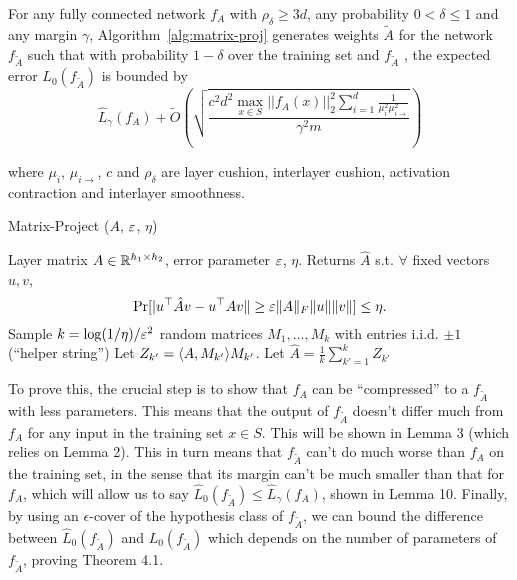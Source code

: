 \begin{theorem}\label{fc-net-theorem} For any fully connected network $f_A$ with $\rho_\delta \geq 3d$, any probability $0 < \delta \leq 1$ and any margin $\gamma$, Algorithm~\ref{alg:matrix-proj} generates weights $\tilde{A}$ for the network $f_{\tilde{A}}$ such that with probability $1-\delta$ over the training set and $f_{\tilde{A}}$ , the expected error $L_0(f_{\tilde{A}})$ is bounded by 
\begin{equation*}
    \hat{L}_\gamma(f_A) + \tilde{O}\left ( \sqrt{\frac{c^2 d^2 \max_{x \in S} || f_A(x) ||_2^2 \sum_{i=1}^d \frac{1}{\mu_i^2 \mu^2_{i\rightarrow}}}{\gamma^2 m}} \right)
\end{equation*}

where $\mu_i$, $\mu_{i\rightarrow}$, $c$ and $\rho_\delta$ are layer cushion, interlayer cushion, activation contraction and interlayer smoothness.

\end{theorem}

\begin{algorithm}
    \caption{Matrix-Project ($A$, $\eps$, $\eta$)}
    \begin{algorithmic}
        \REQUIRE Layer matrix $A\in \mathbb{R}^{h_1\times h_2}$, error parameter $\eps$, $\eta$.
        \ENSURE Returns $\hat{A}$ s.t. $\forall$ fixed vectors $u,v$, $$\Pr[|u^\top \hat{A} v - u^\top Av\| \ge \eps\|A\|_F\|u\|\|v\|] \le \eta.$$
        \STATE Sample $k = \log(1/\eta)/\eps^2$ random matrices $M_1,\dots,M_k$ with entries i.i.d. $\pm 1$ (\textquotedblleft helper string\textquotedblright)
        \STATE Let $Z_{k'} = \langle A,M_{k'} \rangle M_{k'}$.
        \ENDFOR
        \STATE Let $\hat{A} =\frac{1}{k}\sum_{k'=1}^k Z_{k'}$
    \end{algorithmic}
    \label{alg:matrix-proj}
\end{algorithm}


To prove this, the crucial step is to show that $f_A$ can be ``compressed'' to a $f_{\tilde{A}}$ with less parameters. This means that the output of $f_{\tilde{A}}$ doesn't differ much from $f_A$ for any input in the training set $x \in S$. This will be shown in Lemma 3 (which relies on Lemma 2). This in turn means that $f_{\tilde{A}}$ can't do much worse than $f_A$ on the training set, in the sense that its margin can't be much smaller than that for $f_A$, which will allow us to say $\hat{L}_0(f_{\tilde{A}}) \leq \hat{L}_\gamma(f_{A})$, shown in Lemma 10. Finally, by using an $\epsilon$-cover of the hypothesis class of $f_{\tilde{A}}$, we can bound the difference between $\hat{L}_0(f_{\tilde{A}})$ and $L_0(f_{\tilde{A}})$ which depends on the number of parameters of $f_{\tilde{A}}$, proving Theorem 4.1.

